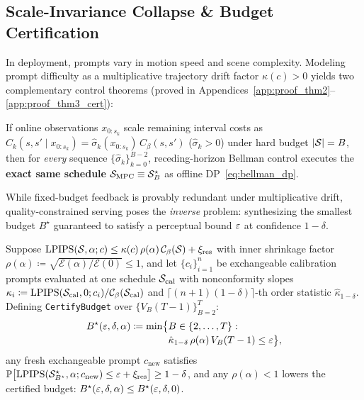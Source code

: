 \subsection{Scale-Invariance Collapse \& Budget Certification}
\label{sec:invariance}

In deployment, prompts vary in motion speed and scene complexity. Modeling prompt difficulty as a multiplicative trajectory drift factor $\kappa(c) > 0$ yields two complementary control theorems (proved in Appendices~\ref{app:proof_thm2}--\ref{app:proof_thm3_cert}):

\begin{theorem}
\label{thm:invariance}
If online observations $x_{0:s_k}$ scale remaining interval costs as $\widehat{C}_k(s, s' \mid x_{0:s_k}) = \hat{\sigma}_k(x_{0:s_k})\,C_\beta(s, s')$ ($\hat{\sigma}_k > 0$) under hard budget $|\mathcal{S}| = B$, then for \emph{every} sequence $\{\hat{\sigma}_k\}_{k=0}^{B-2}$, receding-horizon Bellman control executes the \textbf{exact same schedule} $\mathcal{S}_{\mathrm{MPC}} \equiv \mathcal{S}_B^\star$ as offline DP~\eqref{eq:bellman_dp}.
\end{theorem}

While fixed-budget feedback is provably redundant under multiplicative drift, quality-constrained serving poses the \emph{inverse} problem: synthesizing the smallest budget $B^\star$ guaranteed to satisfy a perceptual bound $\varepsilon$ at confidence $1 - \delta$.

\begin{theorem}
\label{thm:certify}
Suppose $\mathrm{LPIPS}(\mathcal{S}, \alpha; c) \le \kappa(c)\,\rho(\alpha)\,\mathcal{C}_\beta(\mathcal{S}) + \xi_{\mathrm{res}}$ with inner shrinkage factor $\rho(\alpha) \coloneqq \sqrt{\mathcal{E}(\alpha)/\mathcal{E}(0)} \le 1$, and let $\{c_i\}_{i=1}^n$ be exchangeable calibration prompts evaluated at one schedule $\mathcal{S}_{\mathrm{cal}}$ with nonconformity slopes $\kappa_i \coloneqq \mathrm{LPIPS}(\mathcal{S}_{\mathrm{cal}}, 0; c_i) / \mathcal{C}_\beta(\mathcal{S}_{\mathrm{cal}})$ and $\lceil(n+1)(1-\delta)\rceil$-th order statistic $\hat{\kappa}_{1-\delta}$. Defining \texttt{CertifyBudget} over $\{V_B(T-1)\}_{B=2}^T$:
\begin{equation}
\begin{aligned}
B^\star(\varepsilon, \delta, \alpha) \coloneqq \min\bigl\{&B \in \{2,\dots,T\} : \\[-2pt]
&\hat{\kappa}_{1-\delta}\,\rho(\alpha)\,V_B(T-1) \le \varepsilon\bigr\},
\end{aligned}
\label{eq:cert_budget}
\end{equation}
any fresh exchangeable prompt $c_{\mathrm{new}}$ satisfies $\mathbb{P}\bigl[\mathrm{LPIPS}(\mathcal{S}_{B^\star}^\star, \alpha; c_{\mathrm{new}}) \le \varepsilon + \xi_{\mathrm{res}}\bigr] \ge 1 - \delta$, and any $\rho(\alpha) < 1$ lowers the certified budget: $B^\star(\varepsilon, \delta, \alpha) \le B^\star(\varepsilon, \delta, 0)$.
\end{theorem}

